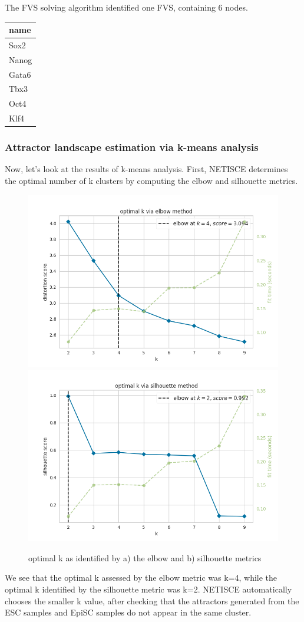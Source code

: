 \documentclass[
]{book}
\begin{document}
The FVS solving algorithm identified one FVS, containing 6 nodes.

\begin{tabular}{l}
\hline
name\\
\hline
Sox2\\
\hline
Nanog\\
\hline
Gata6\\
\hline
Tbx3\\
\hline
Oct4\\
\hline
Klf4\\
\hline
\end{tabular}

\hypertarget{section-id}{%
\subsubsection*{Attractor landscape estimation via k-means analysis}\label{section-id}}

Now, let's look at the results of k-means analysis. First, NETISCE determines the optimal number of k clusters by computing the elbow and silhouette metrics.

\begin{figure}
\includegraphics[width=0.5\linewidth]{ipsc/results/elbow} \includegraphics[width=0.5\linewidth]{ipsc/results/silhouette} \caption{optimal k as identified by a) the elbow and b) silhouette metrics}\label{fig:unnamed-chunk-24}
\end{figure}

We see that the optimal k assessed by the elbow metric was k=4, while the optimal k identified by the silhouette metric was k=2. NETISCE automatically chooses the smaller k value, after checking that the attractors generated from the ESC samples and EpiSC samples do not appear in the same cluster.
\end{document}
